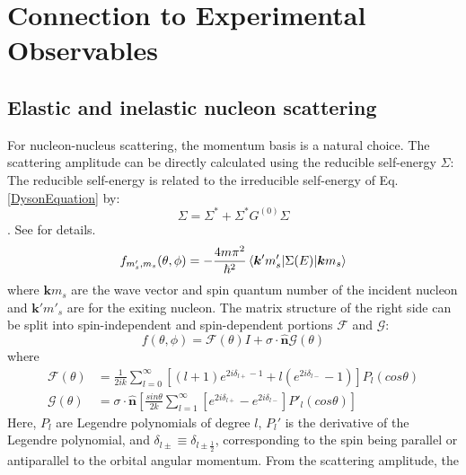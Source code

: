 \section{Connection to Experimental Observables}

\subsection{Elastic and inelastic nucleon scattering} \label{ConnectionToScattering}
For nucleon-nucleus scattering, the momentum basis is a natural choice. The scattering amplitude can be directly calculated using the
reducible self-energy $\Sigma$\footnotemark:
\footnotetext
{
    The reducible self-energy is related to the irreducible
    self-energy of Eq. \ref{DysonEquation} by:
    \begin{equation}
        \Sigma = \Sigma^{*} + \Sigma^{*}G^{(0)}\Sigma
    \end{equation}. See \cite{MahzoonPhDThesis} for details.
}
\begin{equation}
    f_{m'_{s},m_{s}}(\theta,\phi) =
    -\frac{4m\pi^{2}}{\hbar^{2}}\braket{\bm{k}'m'_{s}|\Sigma(E)|\bm{k}m_{s}}
\end{equation}
where $\bm{k}m_{s}$ are the wave vector and spin quantum number of the incident nucleon and
$\bm{k'}m'_{s}$ are for the exiting nucleon. The matrix structure of the right side can be
split into spin-independent and spin-dependent portions $\mathcal{F}$ and $\mathcal{G}$:
\begin{equation}
    f(\theta,\phi) = \mathcal{F}(\theta)I + \sigma\cdot\bm{\hat{n}}\mathcal{G}(\theta)
\end{equation}
where
\begin{equation}
    \begin{split}
        \mathcal{F}(\theta) & = \frac{1}{2ik}\sum_{l=0}^{\infty}\left[(l+1)e^{2i\delta_{l+} - 1} +
        l\left(e^{2i\delta_{l-}}-1\right)\right]P_{l}(cos\theta)\\
        \mathcal{G}(\theta) & =
        \sigma\cdot\bm{\hat{n}}\left[\frac{sin\theta}{2k}\sum_{l=1}^{\infty}[e^{2i\delta_{l+}}-e^{2i\delta_{l-}}]P'_{l}(cos\theta)\right]
    \end{split}
\end{equation}
Here, $P_{l}$ are Legendre polynomials of degree $l$, $P_{l}'$ is the derivative of the Legendre
polynomial, and $\delta_{l\pm} \equiv \delta_{l\pm\frac{1}{2}}$, corresponding to the spin being
parallel or antiparallel to the orbital angular momentum. From the scattering amplitude, the 
